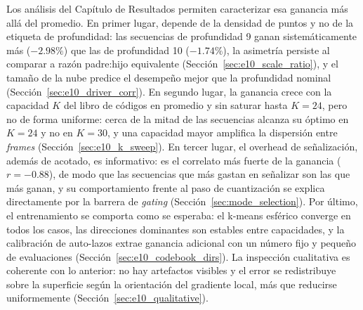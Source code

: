 Los análisis del Capítulo de Resultados permiten caracterizar esa ganancia más allá del
promedio. En primer lugar, depende de la densidad de puntos y no de la etiqueta de profundidad:
las secuencias de profundidad 9 ganan sistemáticamente más ($-2.98\%$) que las de profundidad
10 ($-1.74\%$), la asimetría persiste al comparar a razón padre:hijo equivalente
(Sección~\ref{sec:e10_scale_ratio}), y el tamaño de la nube predice el desempeño mejor que la
profundidad nominal (Sección~\ref{sec:e10_driver_corr}). En segundo lugar, la ganancia crece
con la capacidad $K$ del libro de códigos en promedio y sin saturar hasta $K=24$, pero no de
forma uniforme: cerca de la mitad de las secuencias alcanza su óptimo en $K=24$ y no en $K=30$,
y una capacidad mayor amplifica la dispersión entre \textit{frames}
(Sección~\ref{sec:e10_k_sweep}). En tercer lugar, el overhead de señalización, además de
acotado, es informativo: es el correlato más fuerte de la ganancia ($r=-0.88$), de modo que las
secuencias que más gastan en señalizar son las que más ganan, y su comportamiento frente al
paso de cuantización se explica directamente por la barrera de \textit{gating}
(Sección~\ref{sec:mode_selection}). Por último, el entrenamiento se comporta como se esperaba:
el k-means esférico converge en todos los casos, las direcciones dominantes son estables entre
capacidades, y la calibración de auto-lazos extrae ganancia adicional con un número fijo y
pequeño de evaluaciones (Sección~\ref{sec:e10_codebook_dirs}). La inspección cualitativa es
coherente con lo anterior: no hay artefactos visibles y el error se redistribuye sobre la
superficie según la orientación del gradiente local, más que reducirse uniformemente
(Sección~\ref{sec:e10_qualitative}).

